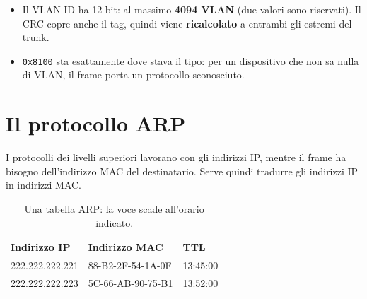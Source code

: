 \begin{itemize}
    \item Il VLAN ID ha 12 bit: al massimo \textbf{4094 VLAN} (due valori sono riservati). Il CRC copre anche il tag, quindi viene
          \textbf{ricalcolato} a entrambi gli estremi del trunk.
    \item \texttt{0x8100} sta esattamente dove stava il tipo: per un dispositivo che non sa nulla di VLAN, il frame porta un protocollo
          sconosciuto.
\end{itemize}

\section{Il protocollo ARP}

I protocolli dei livelli superiori lavorano con gli indirizzi IP, mentre il frame ha bisogno dell'indirizzo MAC del destinatario. Serve quindi
tradurre gli indirizzi IP in indirizzi MAC.


\begin{table}[H]
\centering
\begin{tabular}{lll}
\toprule
\textbf{Indirizzo IP} & \textbf{Indirizzo MAC} & \textbf{TTL} \\
\midrule
222.222.222.221 & 88-B2-2F-54-1A-0F & 13:45:00 \\
222.222.222.223 & 5C-66-AB-90-75-B1 & 13:52:00 \\
\bottomrule
\end{tabular}
\caption{Una tabella ARP: la voce scade all'orario indicato.}
\end{table}

